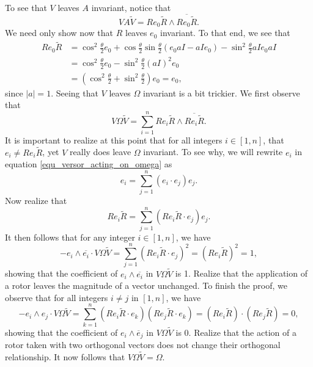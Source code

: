 \documentclass[12pt]{article}
\numberwithin{equation}{section}
\begin{document}
To see that $V$ leaves $A$ invariant, notice that
\begin{equation}
VA\tilde{V} = Re_0\tilde{R}\wedge\overline{Re_0\tilde{R}}.
\end{equation}
We need only show now that $R$ leaves $e_0$ invariant.  To that end, we see that
\begin{align}
Re_0\tilde{R} &= \cos^2\frac{\theta}{2}e_0 + \cos\frac{\theta}{2}\sin\frac{\theta}{2}(e_0 aI - aIe_0) - \sin^2\frac{\theta}{2}aIe_0aI \\
 &= \cos^2\frac{\theta}{2}e_0 - \sin^2\frac{\theta}{2}(aI)^2 e_0 \\
 &= \left(\cos^2\frac{\theta}{2}+\sin^2\frac{\theta}{2}\right)e_0 = e_0,
\end{align}
since $|a|=1$.  Seeing that $V$ leaves $\Omega$ invariant is a bit trickier.  We first
observe that
\begin{equation}\label{equ_versor_acting_on_omega}
V\Omega\tilde{V} = \sum_{i=1}^n Re_i\tilde{R}\wedge\overline{R e_i\tilde{R}}.
\end{equation}
It is important to realize at this point that for all integers $i\in[1,n]$, that $e_i\neq Re_i\tilde{R}$,
yet $V$ really does leave $\Omega$ invariant.  To see why, we will rewrite $e_i$
in equation \eqref{equ_versor_acting_on_omega} as
\begin{equation}
e_i = \sum_{j=1}^n (e_i\cdot e_j)e_j.
\end{equation}
Now realize that
\begin{equation}
Re_i\tilde{R} = \sum_{j=1}^n (Re_i\tilde{R}\cdot e_j)e_j.
\end{equation}
It then follows that for any integer $i\in[1,n]$, we have
\begin{equation}
-e_i\wedge\overline{e_i}\cdot V\Omega\tilde{V} = \sum_{j=1}^n (Re_i\tilde{R}\cdot e_j)^2 = (Re_i\tilde{R})^2 = 1,
\end{equation}
showing that the coefficient of $e_i\wedge\overline{e_i}$ in $V\Omega\tilde{V}$ is 1.  Realize that
the application of a rotor leaves the magnitude of a vector unchanged.  To finish the proof, we
observe that for all integers $i\neq j$ in $[1,n]$, we have
\begin{equation}
-e_i\wedge e_j\cdot V\Omega\tilde{V} = \sum_{k=1}^n (Re_i\tilde{R}\cdot e_k)(Re_j\tilde{R}\cdot e_k)
= (Re_i\tilde{R})\cdot(Re_j\tilde{R}) = 0,
\end{equation}
showing that the coefficient of $e_i\wedge\overline e_j$ in $V\Omega\tilde{V}$ is 0.  Realize that
the action of a rotor taken with two orthogonal vectors does not change their orthogonal relationship.
It now follows that $V\Omega\tilde{V}=\Omega$.
\end{document}
